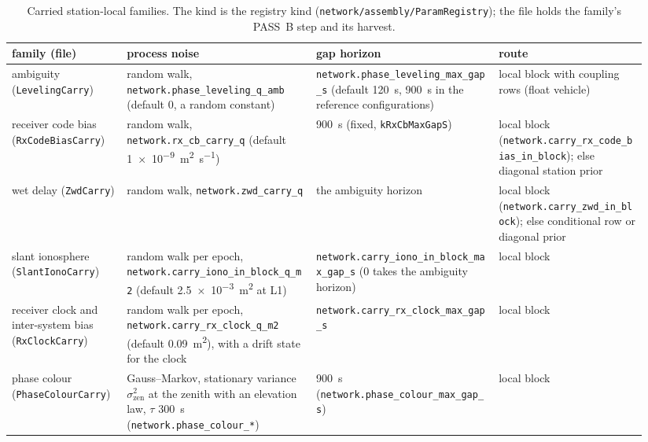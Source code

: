 \documentclass[main.tex]{subfiles}
\begin{document}
\begin{table}[tbp]
\centering
\caption{Carried station-local families.  The kind is the registry kind
(\texttt{network/assembly/ParamRegistry}); the file holds the family's
PASS~B step and its harvest.}
\label{tab:carry-families}
\footnotesize
\setlength{\tabcolsep}{3pt}
\begin{tabular}{@{}>{\raggedright\arraybackslash}p{0.17\linewidth}>{\raggedright\arraybackslash}p{0.28\linewidth}>{\raggedright\arraybackslash}p{0.27\linewidth}>{\raggedright\arraybackslash}p{0.22\linewidth}@{}}
\toprule
family (file) & process noise & gap horizon & route \\
\midrule
ambiguity (\texttt{Leveling\-Carry}) & random walk, \texttt{network.phase\_leveling\_q\_amb} (default $0$, a random constant) & \texttt{network.phase\_leveling\_max\_gap\_s} (default \SI{120}{\second}, \SI{900}{\second} in the reference configurations) & local block with coupling rows (float vehicle) \\
receiver code bias (\texttt{RxCodeBias\-Carry}) & random walk, \texttt{network.rx\_cb\_carry\_q} (default \SI{1e-9}{\metre\squared\per\second}) & \SI{900}{\second} (fixed, \texttt{kRxCbMaxGapS}) & local block (\texttt{network.carry\_rx\_code\_bias\_in\_block}); else diagonal station prior \\
wet delay (\texttt{ZwdCarry}) & random walk, \texttt{network.zwd\_carry\_q} & the ambiguity horizon & local block (\texttt{network.carry\_zwd\_in\_block}); else conditional row or diagonal prior \\
slant ionosphere (\texttt{SlantIono\-Carry}) & random walk per epoch, \texttt{network.carry\_iono\_in\_block\_q\_m2} (default \SI{2.5e-3}{\metre\squared} at L1) & \texttt{network.carry\_iono\_in\_block\_max\_gap\_s} ($0$ takes the ambiguity horizon) & local block \\
receiver clock and inter-system bias (\texttt{RxClock\-Carry}) & random walk per epoch, \texttt{network.carry\_rx\_clock\_q\_m2} (default \SI{0.09}{\metre\squared}), with a drift state for the clock & \texttt{network.carry\_rx\_clock\_max\_gap\_s} & local block \\
phase colour (\texttt{PhaseColour\-Carry}) & Gauss--Markov, stationary variance $\sigma_{\mathrm{zen}}^2$ at the zenith with an elevation law, $\tau$ \SI{300}{\second} (\texttt{network.phase\_colour\_*}) & \SI{900}{\second} (\texttt{network.phase\_colour\_max\_gap\_s}) & local block \\
\bottomrule
\end{tabular}
\end{table}
\end{document}
